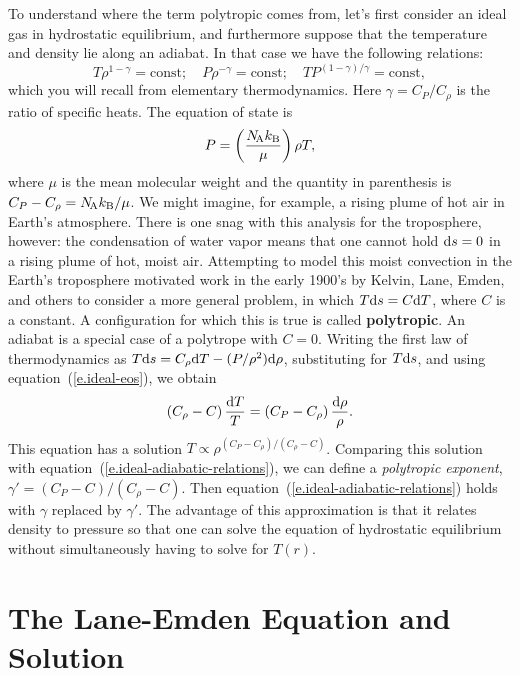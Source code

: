 To understand where the term polytropic comes from, let's first consider an ideal gas in hydrostatic equilibrium, and furthermore suppose that the temperature and density lie along an adiabat.  In that case we have the following relations:
\begin{equation}\label{e.ideal-adiabatic-relations} 
T\rho^{1-\gamma} = \mathrm{const};\quad P\rho^{-\gamma} = \mathrm{const};\quad TP^{(1-\gamma)/\gamma} = \mathrm{const},
\end{equation}
which you will recall from elementary thermodynamics. Here $\gamma = C_{P}/C_{\rho}$ is the ratio of specific heats. The equation of state is
\begin{equation}\label{e.ideal-eos}
P = \left(\frac{N_\mathrm{\!A}k_\mathrm{B}}{\mu}\right)\rho T,
\end{equation}
where $\mu$ is the mean molecular weight and the quantity in parenthesis is $C_{P}-C_{\rho} = N_\mathrm{\!A}k_\mathrm{B}/\mu$.
We might imagine, for example, a rising plume of hot air in Earth's atmosphere.  There is one snag with this analysis for the troposphere, however: the condensation of water vapor means that one cannot hold $\mathrm{d} s = 0$ in a rising plume of hot, moist air.  Attempting to model this moist convection in the Earth's troposphere motivated work in the early 1900's by Kelvin, Lane, Emden, and others to consider a more general problem, in which $T\mathrm{d} s = C\mathrm{d} T$, where $C$ is a constant.  A configuration for which this is true is called \textbf{polytropic}. An adiabat is a special case of a polytrope with $C = 0$. Writing the first law of thermodynamics as $T\mathrm{d} s = C_{\rho}\mathrm{d} T -(P/\rho^{2})\mathrm{d} \rho$, substituting for $T\mathrm{d} s$, and using equation~(\ref{e.ideal-eos}), we obtain
\[
\left(C_{\rho}-C\right)\frac{\mathrm{d} T}{T} = \left( C_{P} - C_{\rho}\right)\frac{\mathrm{d}\rho}{\rho}.
\]
This equation has a solution $T  \propto  \rho^{(C_{P}-C_{\rho})/(C_{\rho}-C)}$. Comparing this solution with equation~(\ref{e.ideal-adiabatic-relations}), we can define a \emph{polytropic exponent}, $\gamma' = (C_{P}-C)/(C_{\rho}-C)$. Then equation~(\ref{e.ideal-adiabatic-relations}) holds with $\gamma$ replaced by $\gamma'$.  The advantage of this approximation is that it relates density to pressure so that one can solve the equation of hydrostatic equilibrium without simultaneously having to solve for $T(r)$.

\section{The Lane-Emden Equation and Solution}\label{s.LE-solution}


